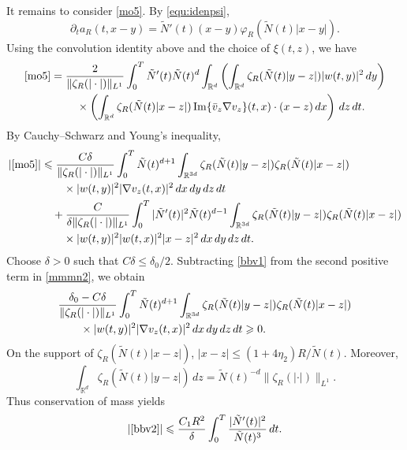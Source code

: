 \documentclass[reqno,11pt]{amsart}
\theoremstyle{plain}
\theoremstyle{definition}
\numberwithin{equation}{section}
\numberwithin{theorem}{section}
\def\geq{\geqslant}
\def\leq{\leqslant}
\def\R{\mathbb{R}}
\begin{document}
It remains to consider \eqref{mo5}. By \eqref{equ:idenpsi},
\[
 \partial_ta_R(t,x-y)=\tilde N'(t)(x-y)
                            \varphi_R(\tilde N(t)|x-y|).
\]
Using the convolution identity above and the choice of $\xi(t,z)$, we have
\begin{align*}
 \eqref{mo5}
 ={}&\frac2{\|\zeta_R(|\cdot|)\|_{L^1}}
       \int_0^T\tilde N'(t)\tilde N(t)^d
       \int_{\R^d}\left(\int_{\R^d}
          \zeta_R(\tilde N(t)|y-z|)|w(t,y)|^2\,dy\right)\\
 &\quad\times\left(\int_{\R^d}\zeta_R(\tilde N(t)|x-z|)
       \operatorname{Im}\{\bar v_z\nabla v_z\}(t,x)\cdot(x-z)\,dx\right)
       \,dz\,dt.
\end{align*}
By Cauchy--Schwarz and Young's inequality,
\begin{align}
 |\eqref{mo5}|
 &\leq\frac{C\delta}{\|\zeta_R(|\cdot|)\|_{L^1}}
       \int_0^T\tilde N(t)^{d+1}\int_{\R^{3d}}
       \zeta_R(\tilde N(t)|y-z|)\zeta_R(\tilde N(t)|x-z|)\notag\\
 &\qquad\times |w(t,y)|^2|\nabla v_z(t,x)|^2\,dx\,dy\,dz\,dt\label{bbv1}\\
 &\quad+\frac{C}{\delta\|\zeta_R(|\cdot|)\|_{L^1}}
       \int_0^T|\tilde N'(t)|^2\tilde N(t)^{d-1}\int_{\R^{3d}}
       \zeta_R(\tilde N(t)|y-z|)\zeta_R(\tilde N(t)|x-z|)\notag\\
 &\qquad\times |w(t,y)|^2|w(t,x)|^2|x-z|^2\,dx\,dy\,dz\,dt.\label{bbv2}
\end{align}
Choose $\delta>0$ such that $C\delta\leq\delta_0/2$. Subtracting
\eqref{bbv1} from the second positive term in \eqref{mmmn2}, we obtain
\begin{align}\label{finala}
 &\frac{\delta_0-C\delta}{\|\zeta_R(|\cdot|)\|_{L^1}}
       \int_0^T\tilde N(t)^{d+1}\int_{\R^{3d}}
       \zeta_R(\tilde N(t)|y-z|)\zeta_R(\tilde N(t)|x-z|)\notag\\
 &\qquad\times |w(t,y)|^2|\nabla v_z(t,x)|^2\,dx\,dy\,dz\,dt
       \geq0.
\end{align}
On the support of $\zeta_R(\tilde N(t)|x-z|)$,
$|x-z|\leq(1+4\eta_2)R/\tilde N(t)$. Moreover,
\[
 \int_{\R^d}\zeta_R(\tilde N(t)|y-z|)\,dz
 =\tilde N(t)^{-d}\|\zeta_R(|\cdot|)\|_{L^1}.
\]
Thus conservation of mass yields
\begin{equation}\label{finalb}
 |\eqref{bbv2}|\leq\frac{C_1R^2}{\delta}
               \int_0^T\frac{|\tilde N'(t)|^2}{\tilde N(t)^3}\,dt.
\end{equation}
\end{document}
